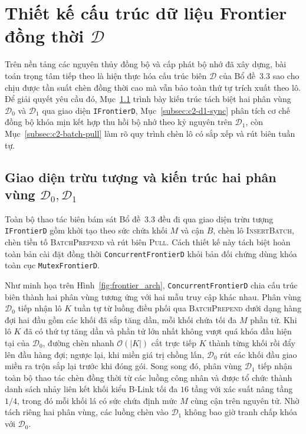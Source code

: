 \section{Thiết kế cấu trúc dữ liệu Frontier đồng thời $\mathcal{D}$}\label{sec:c2-frontier}

Trên nền tảng các nguyên thủy đồng bộ và cấp phát bộ nhớ đã xây dựng, bài toán trọng tâm tiếp theo là hiện thực hóa cấu trúc biên $\mathcal{D}$ của Bổ đề~3.3 sao cho chịu được tần suất chèn đồng thời cao mà vẫn bảo toàn thứ tự trích xuất theo lô. Để giải quyết yêu cầu đó, Mục~\ref{subsec:c2-frontier-arch} trình bày kiến trúc tách biệt hai phân vùng $\mathcal{D}_0$ và $\mathcal{D}_1$ qua giao diện \texttt{IFrontierD}, Mục~\ref{subsec:c2-d1-sync} phân tích cơ chế đồng bộ khóa mịn kết hợp thu hồi bộ nhớ theo kỷ nguyên trên $\mathcal{D}_1$, còn Mục~\ref{subsec:c2-batch-pull} làm rõ quy trình chèn lô có sắp xếp và rút biên tuần tự.

\subsection{Giao diện trừu tượng và kiến trúc hai phân vùng $\mathcal{D}_0, \mathcal{D}_1$}\label{subsec:c2-frontier-arch}

Toàn bộ thao tác biên bám sát Bổ đề~3.3 đều đi qua giao diện trừu tượng \texttt{IFrontierD} gồm khởi tạo theo sức chứa khối $M$ và cận $B$, chèn lô \textsc{InsertBatch}, chèn tiền tố \textsc{BatchPrepend} và rút biên \textsc{Pull}. Cách thiết kế này tách biệt hoàn toàn bản cài đặt đồng thời \texttt{Concurrent\allowbreak FrontierD} khỏi bản đối chứng dùng khóa toàn cục \texttt{Mutex\allowbreak FrontierD}.

Như minh họa trên Hình~\ref{fig:frontier_arch}, \texttt{Concurrent\allowbreak FrontierD} chia cấu trúc biên thành hai phân vùng tương ứng với hai mẫu truy cập khác nhau. Phân vùng $\mathcal{D}_0$ tiếp nhận lô $K$ tuần tự từ luồng điều phối qua \textsc{BatchPrepend} dưới dạng hàng đợi hai đầu gồm các khối đã sắp tăng dần, mỗi khối chứa tối đa $M$ phần tử. Khi lô $K$ đã có thứ tự tăng dần và phần tử lớn nhất không vượt quá khóa đầu hiện tại của $\mathcal{D}_0$, đường chèn nhanh $\mathcal{O}(|K|)$ cắt trực tiếp $K$ thành từng khối rồi đẩy lên đầu hàng đợi; ngược lại, khi miền giá trị chồng lấn, $\mathcal{D}_0$ rút các khối đầu giao miền ra trộn sắp lại trước khi đóng gói. Song song đó, phân vùng $\mathcal{D}_1$ tiếp nhận toàn bộ thao tác chèn đồng thời từ các luồng công nhân và được tổ chức thành danh sách nhảy liên kết khối kiểu B-Link tối đa $16$ tầng với xác suất nâng tầng $1/4$, trong đó mỗi khối lá có sức chứa định mức $M$ cùng cận trên nguyên tử. Nhờ tách riêng hai phân vùng, các luồng chèn vào $\mathcal{D}_1$ không bao giờ tranh chấp khóa với $\mathcal{D}_0$.

